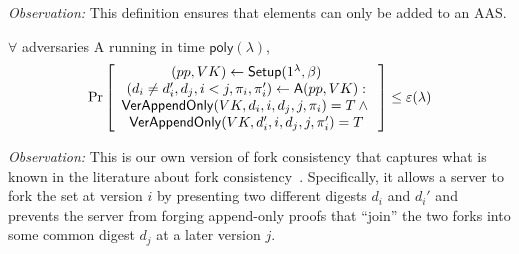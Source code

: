 \noindent \textit{Observation:}
This definition ensures that elements can only be added to an AAS.

\label{s:aas:fork-consistency}
$\forall$ adversaries \textsf{A} running in time $\mathsf{poly}(\lambda)$,
\begin{align*}
\Pr \left[ \begin{array}{c}
(pp,VK) \leftarrow \mathsf{Setup}(1^\lambda, \beta)\\
(d_i\ne d_i',d_j,i<j,\pi_i,\pi_i') \leftarrow \mathsf{A}(pp, VK)
: \\
{\mathsf{VerAppendOnly}(VK, d_i , i, d_j, j, \pi_i) = T} \wedge {}\\
{\mathsf{VerAppendOnly}(VK, d_i', i, d_j, j, \pi_i') = T}\\
\end{array} \right] \le \varepsilon(\lambda)
\end{align*}

\noindent \textit{Observation:}
This is our own version of fork consistency that captures what is known in the literature about fork consistency~\cite{ht,beyondonethird}.
Specifically, it allows a server to fork the set at version $i$ by presenting two different digests $d_i$ and $d_i'$ and prevents the server from forging append-only proofs that ``join'' the two forks into some common digest $d_j$ at a later version $j$.
